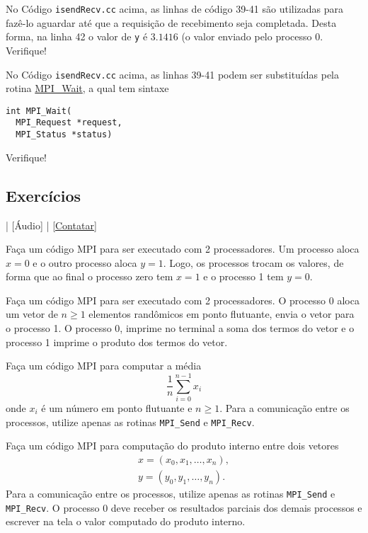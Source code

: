 No Código \verb+isendRecv.cc+ acima, as linhas de código 39-41 são utilizadas para fazê-lo aguardar até que a requisição de recebimento seja completada. Desta forma, na linha 42 o valor de \verb+y+ é $3.1416$ (o valor enviado pelo processo 0. Verifique!

\begin{obs}
  No Código \verb+isendRecv.cc+ acima, as linhas 39-41 podem ser substituídas pela rotina \href{https://www.open-mpi.org/doc/current/man3/MPI\_Wait.3.php}{MPI\_Wait}, a qual tem sintaxe
\begin{verbatim}
int MPI_Wait(
  MPI_Request *request, 
  MPI_Status *status)
\end{verbatim}
  Verifique!
\end{obs}

\subsection* {Exercícios}

\begin{flushright}
  [Vídeo] | [Áudio] | \href{https://phkonzen.github.io/notas/contato.html}{[Contatar]}
\end{flushright}

\begin{exer}
  Faça um código MPI para ser executado com 2 processadores. Um processo aloca $x = 0$ e o outro processo aloca $y=1$. Logo, os processos trocam os valores, de forma que ao final o processo zero tem $x = 1$ e o processo 1 tem $y=0$.
\end{exer}

\begin{exer}
  Faça um código MPI para ser executado com 2 processadores. O processo 0 aloca um vetor de $n\geq 1$ elementos randômicos em ponto flutuante, envia o vetor para o processo 1. O processo 0, imprime no terminal a soma dos termos do vetor e o processo 1 imprime o produto dos termos do vetor.
\end{exer}


\begin{exer}
  Faça um código MPI para computar a média
  \begin{equation}
    \frac{1}{n}\sum_{i=0}^{n-1} x_i
  \end{equation}
  onde $x_i$ é um número em ponto flutuante e $n\geq 1$. Para a comunicação entre os processos, utilize apenas as rotinas \verb+MPI_Send+ e \verb+MPI_Recv+.
\end{exer}

\begin{exer}\label{exer:mpi_prodin}
  Faça um código MPI para computação do produto interno entre dois vetores
  \begin{gather}
    x = (x_0, x_1, \dotsc, x_n),\\
    y = (y_0, y_1, \dotsc, y_n).
  \end{gather}
  Para a comunicação entre os processos, utilize apenas as rotinas \verb+MPI_Send+ e \verb+MPI_Recv+. O processo 0 deve receber os resultados parciais dos demais processos e escrever na tela o valor computado do produto interno.
\end{exer}

